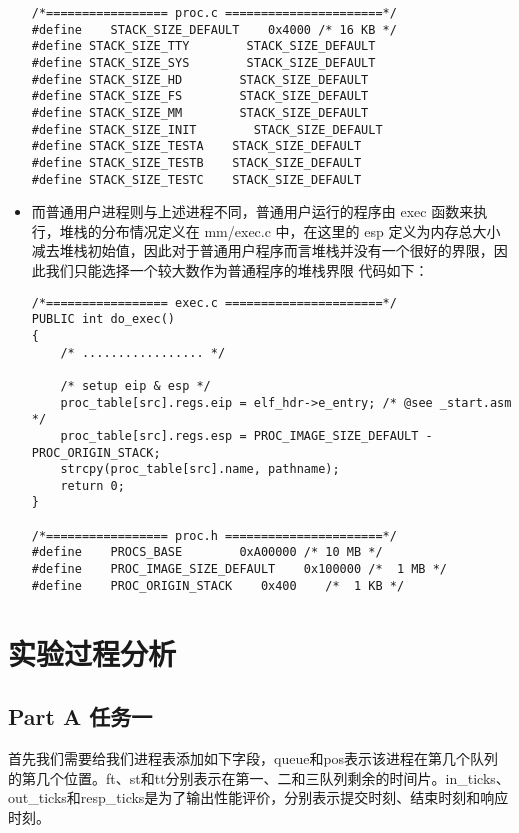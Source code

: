 \documentclass{whureport}
\begin{document}
\begin{itemize}
\begin{lstlisting}
/*================= proc.c ======================*/
#define    STACK_SIZE_DEFAULT    0x4000 /* 16 KB */
#define STACK_SIZE_TTY        STACK_SIZE_DEFAULT
#define STACK_SIZE_SYS        STACK_SIZE_DEFAULT
#define STACK_SIZE_HD        STACK_SIZE_DEFAULT
#define STACK_SIZE_FS        STACK_SIZE_DEFAULT
#define STACK_SIZE_MM        STACK_SIZE_DEFAULT
#define STACK_SIZE_INIT        STACK_SIZE_DEFAULT
#define STACK_SIZE_TESTA    STACK_SIZE_DEFAULT
#define STACK_SIZE_TESTB    STACK_SIZE_DEFAULT
#define STACK_SIZE_TESTC    STACK_SIZE_DEFAULT
	\end{lstlisting}
	\item 而普通用户进程则与上述进程不同，普通用户运行的程序由 exec 函数来执行，堆栈的分布情况定义在 mm/exec.c 中，在这里的 esp 定义为内存总大小减去堆栈初始值，因此对于普通用户程序而言堆栈并没有一个很好的界限，因此我们只能选择一个较大数作为普通程序的堆栈界限 代码如下：
	\begin{lstlisting}
/*================= exec.c ======================*/
PUBLIC int do_exec()
{
    /* ................. */
    
    /* setup eip & esp */
    proc_table[src].regs.eip = elf_hdr->e_entry; /* @see _start.asm */
    proc_table[src].regs.esp = PROC_IMAGE_SIZE_DEFAULT - PROC_ORIGIN_STACK;
    strcpy(proc_table[src].name, pathname);
    return 0;
}

/*================= proc.h ======================*/
#define    PROCS_BASE        0xA00000 /* 10 MB */
#define    PROC_IMAGE_SIZE_DEFAULT    0x100000 /*  1 MB */
#define    PROC_ORIGIN_STACK    0x400    /*  1 KB */

	\end{lstlisting}
\end{itemize}


\section{实验过程分析}

\subsection{Part A 任务一}
首先我们需要给我们进程表添加如下字段，queue和pos表示该进程在第几个队列的第几个位置。ft、st和tt分别表示在第一、二和三队列剩余的时间片。in\_ticks、out\_ticks和resp\_ticks是为了输出性能评价，分别表示提交时刻、结束时刻和响应时刻。
\end{document}

